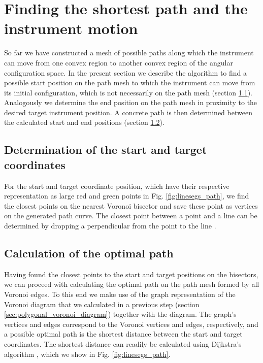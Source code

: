 \section{Finding the shortest path and the instrument motion}
\label{sec:exepath}

So far we have constructed a mesh of possible paths along which the instrument can move
from one convex region to another convex region of the angular configuration space.
In the present section we describe the algorithm to find a possible start position on the
path mesh to which the instrument can move from its initial configuration, which is
not necessarily on the path mesh (section \ref{sec:startend}).
Analogously we determine the end position on the path mesh in proximity to the desired target
instrument position.
A concrete path is then determined between the calculated start and end positions
(section \ref{sec:optimalpath}).


\subsection{Determination of the start and target coordinates}
\label{sec:startend}

For the start and target coordinate position, which have their respective representation as large
red and green points in Fig. \ref{fig:linesegs_path}, we find the closest points on the
nearest Voronoi bisector and save these point as vertices on the generated path curve.
The closest point between a point and a line can be determined by dropping a perpendicular
from the point to the line \cite{TODO}.


\subsection{Calculation of the optimal path}
\label{sec:optimalpath}

Having found the closest points to the start and target positions on the bisectors, we can
proceed with calculating the optimal path on the path mesh formed by all Voronoi edges.
To this end we make use of the graph representation of the Voronoi diagram that we calculated
in a previous step (section \ref{sec:polygonal_voronoi_diagram}) together with the diagram.
The graph's vertices and edges correspond to the Voronoi vertices and edges, respectively,
and a possible optimal path is the shortest distance between the start and target coordinates.
The shortest distance can readily be calculated using Dijkstra's algorithm \cite[unit 4, p. 17]{FUH_algo2021},
which we show in Fig. \ref{fig:linesegs_path}.


